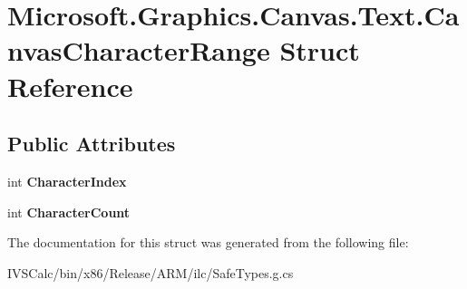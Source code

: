 \hypertarget{struct_microsoft_1_1_graphics_1_1_canvas_1_1_text_1_1_canvas_character_range}{}\section{Microsoft.\+Graphics.\+Canvas.\+Text.\+Canvas\+Character\+Range Struct Reference}
\label{struct_microsoft_1_1_graphics_1_1_canvas_1_1_text_1_1_canvas_character_range}
\subsection*{Public Attributes}
\begin{DoxyCompactItemize}
\item 
\mbox{\label{struct_microsoft_1_1_graphics_1_1_canvas_1_1_text_1_1_canvas_character_range_a7c620e167603bd1f1cab4fbc96090262}} 
int {\bfseries Character\+Index}
\item 
\mbox{\label{struct_microsoft_1_1_graphics_1_1_canvas_1_1_text_1_1_canvas_character_range_a52d7f01bf09c7574750f40356166c566}} 
int {\bfseries Character\+Count}
\end{DoxyCompactItemize}


The documentation for this struct was generated from the following file\+:\begin{DoxyCompactItemize}
\item 
I\+V\+S\+Calc/bin/x86/\+Release/\+A\+R\+M/ilc/Safe\+Types.\+g.\+cs\end{DoxyCompactItemize}
